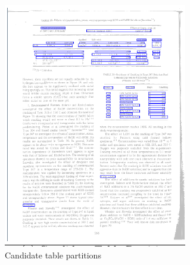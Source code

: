 \begin{figure}
\begin{subfigure}{0.30\textwidth}
\includegraphics[width=\linewidth]{img/tableDetection/tableDetectionCandidate.pdf}
\caption{Candidate table partitions}
\label{fig:tessTableDet3}
\end{subfigure}
\\
\begin{subfigure}{0.30\textwidth}

\end{subfigure}
\end{figure}
